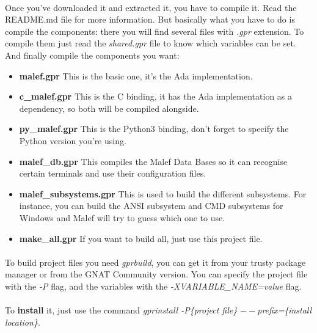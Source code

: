    \paragraph{}
      Once you've downloaded it and extracted it, you have to compile it.
   Read the README.md file for more information. But basically what you have to
   do is compile the components: there you will find several files with
   \textit{.gpr} extension. To compile them just read the \textit{shared.gpr}
   file to know which variables can be set. And finally compile the components
   you want:
   \begin{itemize}
      \item \textbf{malef.gpr} This is the basic one, it's the Ada
         implementation.
      \item \textbf{c\_malef.gpr} This is the C binding, it has the Ada
         implementation as a dependency, so both will be compiled alongside.
      \item \textbf{py\_malef.gpr} This is the Python3 binding, don't forget
         to specify the Python version you're using.
      \item \textbf{malef\_db.gpr} This compiles the Malef Data Bases so it can
         recognise certain terminals and use their configuration files.
      \item \textbf{malef\_subsystems.gpr} This is used to build the different
         subsystems. For instance, you can build the ANSI subsystem and CMD
         subsystems for Windows and Malef will try to guess which one to use.
      \item \textbf{make\_all.gpr} If you want to build all, just use this
         project file.
   \end{itemize}
   \paragraph{}
      To build project files you need \textit{gprbuild}, you can get it from
   your trusty package manager or from the GNAT Community version. You can
   specify the project file with the \textit{-P} flag, and the variables with
   the \textit{-XVARIABLE\_NAME=value} flag.

   \paragraph{}
      To \textbf{install} it, just use the command
   \textit{gprinstall -P\{project file\} $--$prefix=\{install location\}}.


